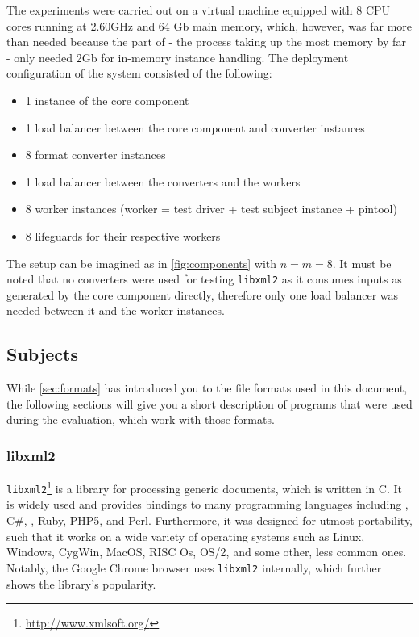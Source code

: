The experiments were carried out on a virtual machine equipped with 8 CPU cores running at 2.60GHz and 64 Gb
main memory, which, however, was far more than needed because the \java part of \xmlmate{} - the process taking
up the most memory by far - only needed 2Gb for in-memory \xml instance handling. The deployment configuration
of the \xmlmate system consisted of the following:

\begin{itemize}
  \item 1 instance of the \java \xmlmate core component
  \item 1 load balancer between the core component and converter instances
  \item 8 format converter instances
  \item 1 load balancer between the converters and the workers
  \item 8 worker instances (worker = test driver + test subject instance + pintool)
  \item 8 lifeguards for their respective workers
\end{itemize}

The setup can be imagined as in \cref{fig:components} with $n = m = 8$.
It must be noted that no converters were used for testing \texttt{libxml2} as it consumes inputs as generated
by the \xmlmate core component directly, therefore only one load balancer was needed between it and
the worker instances.

\subsection{Subjects}
While \cref{sec:formats} has introduced you to the file formats used in this document, the following sections
will give you a short description of programs that were used during the evaluation, which work with those
formats.
\subsubsection{libxml2}
\texttt{libxml2}\footnote{\url{http://www.xmlsoft.org/}} is a library for processing generic \xml documents,
which is written in {\small C}. It is widely used and provides bindings to many programming languages
including \cpp, {\small C\#}, \python{}, {\small Ruby}, {\small PHP5}, and {\small Perl}. Furthermore, it was
designed for utmost portability, such that it works on a wide variety of operating systems such as
Linux, Windows, CygWin, MacOS, RISC Os, OS/2, and some other, less common ones. Notably, the Google Chrome
browser uses \texttt{libxml2} internally, which further shows the library's popularity.

